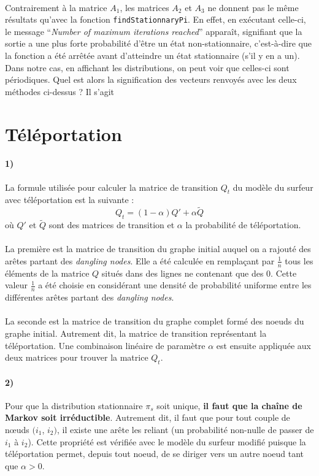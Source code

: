 \documentclass[a4paper,titlepage]{report}
\begin{document}
\paragraph{}
Contrairement à la matrice $A_1$, les matrices $A_2$ et $A_3$ ne donnent pas le même résultats qu'avec la fonction \texttt{findStationnaryPi}. En effet, en exécutant celle-ci, le message ``\textit{Number of maximum iterations reached}'' apparaît, signifiant que la sortie a une plus forte probabilité d'être un état non-stationnaire, c'est-à-dire que la fonction a été arrêtée avant d'atteindre un état stationnaire (s'il y en a un). Dans notre cas, en affichant les distributions, on peut voir que celles-ci sont périodiques. Quel est alors la signification des vecteurs renvoyés avec les deux méthodes ci-dessus ? Il s'agit 

\section{Téléportation}
\paragraph{1)}
La formule utilisée pour calculer la matrice de transition $Q_t$ du modèle du surfeur avec téléportation est la suivante :
\[
	Q_t = (1 - \alpha) Q' + \alpha \tilde{Q}
\]
où $Q'$ et $\tilde{Q}$ sont des matrices de transition et $\alpha$ la probabilité de téléportation. 
\paragraph{}
La première est la matrice de transition du graphe initial auquel on a rajouté des arêtes partant des \textit{dangling nodes}. Elle a été calculée en remplaçant par $\frac{1}{n}$ tous les éléments de la matrice $Q$ situés dans des lignes ne contenant que des 0. Cette valeur $\frac{1}{n}$ a été choisie en considérant une densité de probabilité uniforme entre les différentes arêtes partant des \textit{dangling nodes}. 
\paragraph{}
La seconde est la matrice de transition du graphe complet formé des noeuds du graphe initial. Autrement dit, la matrice de transition représentant la téléportation. Une combinaison linéaire de paramètre $\alpha$ est ensuite appliquée aux deux matrices pour trouver la matrice $Q_t$.
\paragraph{2)}
Pour que la distribution stationnaire $\pi_s$ soit unique, \textbf{il faut que la chaîne de Markov soit irréductible}. Autrement dit, il faut que pour tout couple de nœuds $(i_1$, $i_2)$, il existe une arête les reliant (un probabilité non-nulle de passer de $i_1$ à $i_2$). Cette propriété est vérifiée avec le modèle du surfeur modifié puisque la téléportation permet, depuis tout noeud, de se diriger vers un autre noeud tant que $\alpha > 0$. 
\end{document}
